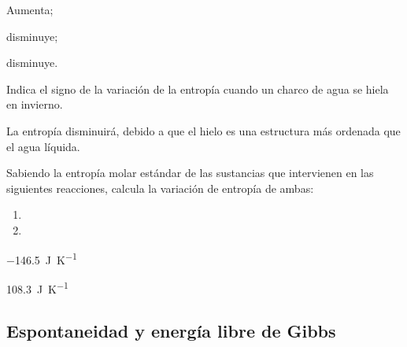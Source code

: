 \documentclass[10pt,a5paper,twoside]{article}
\begin{document}
  \begin{solution}
    \begin{enumerate*}
      \item Aumenta;
      \item disminuye;
      \item disminuye.
    \end{enumerate*}
  \end{solution}



  \begin{exercise}[
      tags    = {termodinámica, entropía},
      topics  = {química, termoquímica, termodinámica},
      source  = {},
    ]
    Indica el signo de la variación de la entropía cuando un charco de agua se hiela en invierno.
  \end{exercise}

  \begin{solution}
    La entropía disminuirá, debido a que el hielo es una estructura más ordenada que el agua líquida.
  \end{solution}




  \begin{exercise}[
      tags    = {termodinámica, entropía},
      topics  = {química, termoquímica, termodinámica},
      source  = {},
    ]
    Sabiendo la entropía molar estándar de las sustancias que intervienen en las siguientes reacciones, calcula la variación de entropía de ambas:
    \begin{enumerate}
      \item {}
      \item {}
    \end{enumerate}
  \end{exercise}

  \begin{solution}
    \begin{enumerate*}
      \item \SI{-146.5}{\joule\per\kelvin}
      \item \SI{108.3}{\joule\per\kelvin}
    \end{enumerate*}
  \end{solution}




  \subsection*{Espontaneidad y energía libre de Gibbs}
\end{document}
